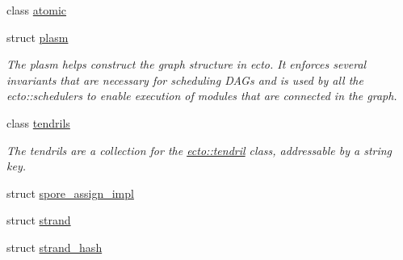 \begin{DoxyCompactItemize}
class \hyperlink{classecto_1_1atomic}{atomic}
\item 
struct \hyperlink{structecto_1_1plasm}{plasm}
\begin{DoxyCompactList}\small\item\em \-The plasm helps construct the graph structure in ecto. \-It enforces several invariants that are necessary for scheduling \-D\-A\-Gs and is used by all the ecto\-::schedulers to enable execution of modules that are connected in the graph. \end{DoxyCompactList}\item 
class \hyperlink{classecto_1_1tendrils}{tendrils}
\begin{DoxyCompactList}\small\item\em \-The tendrils are a collection for the \hyperlink{classecto_1_1tendril}{ecto\-::tendril} class, addressable by a string key. \end{DoxyCompactList}\item 
struct \hyperlink{structecto_1_1spore__assign__impl}{spore\-\_\-assign\-\_\-impl}
\item 
struct \hyperlink{structecto_1_1strand}{strand}
\item 
struct \hyperlink{structecto_1_1strand__hash}{strand\-\_\-hash}
\end{DoxyCompactItemize}
